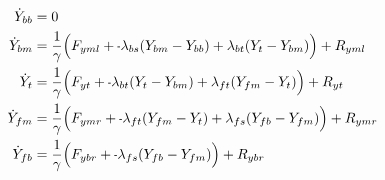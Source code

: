 \documentclass[11pt, landscape]{article}
\newcommand{\mn}{\scalebox{0.7}[1.0]{-}}
\begin{document}
\begin{align}  
  \dot{Y}_{bb} &= 0 \\
  \dot{Y}_{bm} &= \frac{1}{\gamma} \Big(F_{yml} + \mn \lambda_{bs}(Y_{bm} - Y_{bb}) + \lambda_{bt}(Y_{t } - Y_{bm}) \Big) + R_{yml} \\
  \dot{Y}_{t}  &= \frac{1}{\gamma} \Big(F_{yt } + \mn \lambda_{bt}(Y_{t } - Y_{bm}) + \lambda_{ft}(Y_{fm} - Y_{t }) \Big) + R_{yt } \\
  \dot{Y}_{fm} &= \frac{1}{\gamma} \Big(F_{ymr} + \mn \lambda_{ft}(Y_{fm} - Y_{t }) + \lambda_{fs}(Y_{fb} - Y_{fm}) \Big) + R_{ymr} \\
  \dot{Y}_{fb} &= \frac{1}{\gamma} \Big(F_{ybr} + \mn \lambda_{fs}(Y_{fb} - Y_{fm})                                 \Big) + R_{ybr}
\end{align}
\end{document}
